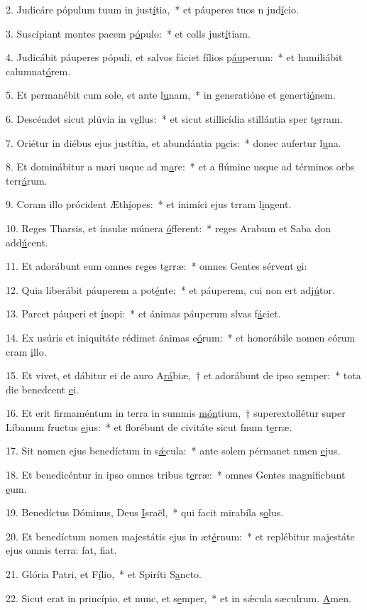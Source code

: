 2. Judicáre pópulum tuum in just\uline{í}tia,~* et páuperes tuos n jud\uline{í}cio.\par 
3. Suscípiant montes pacem p\uline{ó}pulo:~* et colls just\uline{í}tiam.\par 
4. Judicábit páuperes pópuli, et salvos fáciet fílios p\uline{áu}perum:~* et humiliábit calumnat\uline{ó}rem.\par 
5. Et permanébit cum sole, et ante l\uline{u}nam,~* in generatióne et generti\uline{ó}nem.\par 
6. Descéndet sicut plúvia in v\uline{e}llus:~* et sicut stillicídia stillántia sper t\uline{e}rram.\par 
7. Oriétur in diébus ejus justítia, et abundántia p\uline{a}cis:~* donec aufertur l\uline{u}na.\par 
8. Et dominábitur a mari usque ad m\uline{a}re:~* et a flúmine usque ad términos orbs terr\uline{á}rum.\par 
9. Coram illo prócident Æth\uline{í}opes:~* et inimíci ejus trram l\uline{i}ngent.\par 
10. Reges Tharsis, et ínsulæ múnera \uline{ó}fferent:~* reges Arabum et Saba don add\uline{ú}cent.\par 
11. Et adorábunt eum omnes reges t\uline{e}rræ:~* omnes Gentes sérvent \uline{e}i:\par 
12. Quia liberábit páuperem a pot\uline{é}nte:~* et páuperem, cui non ert adj\uline{ú}tor.\par 
13. Parcet páuperi et \uline{í}nopi:~* et ánimas páuperum slvas f\uline{á}ciet.\par 
14. Ex usúris et iniquitáte rédimet ánimas e\uline{ó}rum:~* et honorábile nomen eórum cram \uline{i}llo.\par 
15. Et vivet, et dábitur ei de auro A\uline{rá}biæ,~† et adorábunt de ipso s\uline{e}mper:~* tota die benedcent \uline{e}i.\par 
16. Et erit firmaméntum in terra in summis \uline{món}tium,~† superextollétur super Líbanum fructus \uline{e}jus:~* et florébunt de civitáte sicut fnum t\uline{e}rræ.\par 
17. Sit nomen ejus benedíctum in s\uline{ǽ}cula:~* ante solem pérmanet nmen \uline{e}jus.\par 
18. Et benedicéntur in ipso omnes tribus t\uline{e}rræ:~* omnes Gentes magnificbunt \uline{e}um.\par 
19. Benedíctus Dóminus, Deus \uline{I}sraël,~* qui facit mirabíla s\uline{o}lus.\par 
20. Et benedíctum nomen majestátis ejus in æt\uline{é}rnum:~* et replébitur majestáte ejus omnis terra: fat, f\uline{i}at.\par 
21. Glória Patri, et F\uline{í}lio,~* et Spiríti S\uline{a}ncto.\par 
22. Sicut erat in princípio, et nunc, et s\uline{e}mper,~* et in sǽcula sæculrum. \uline{A}men.\par 

